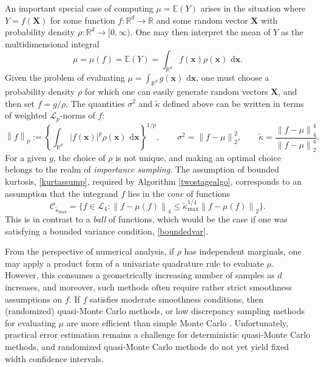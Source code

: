 \documentclass[graybox]{svmult}
\newcommand\reals{\mathbb{R}}
\newcommand\e{\mathbb{E}}
\newcommand{\vx}{\boldsymbol{x}}
\newcommand{\vX}{\boldsymbol{X}}
\newcommand{\rd}{\,\mathrm{d}}
\newcommand{\abs}[1]{\left|#1\right|}
\newcommand{\dif}{\rd}
\newcommand{\tkappa}{\tilde{\kappa}}
\newcommand{\cc}{\mathcal{C}}
\newcommand{\cl}{\mathcal{L}}
\def\abs#1{\ensuremath{\left \lvert #1 \right \rvert}}
\newcommand{\norm}[2][{}]{\ensuremath{\left \lVert #2 \right \rVert}_{#1}}
\begin{document}
An important special case of computing $\mu=\e(Y)$ arises in the situation where $Y=f(\vX)$ for some function $f: \reals^d \to \reals$ and some random vector $\vX$ with probability density $\rho: \reals^d \to [0,\infty)$.  One may then interpret the mean of $Y$ as the multidimensional integral 
\begin{equation} \label{muintegral}
\mu=\mu(f)=\e(Y) = \int_{\reals^d} f(\vx) \rho(\vx) \, \dif \vx.
\end{equation}
Given the problem of evaluating $\mu=\int_{\reals^d} g(\vx) \, \dif \vx$, one must choose a probability density $\rho$ for which one can easily generate random vectors $\vX$, and then set $f = g/\rho$.  The quantities $\sigma^2$ and $\tkappa$ defined above can be written in terms of weighted $\cl_p$-norms of $f$:
\begin{equation} \label{Lpnormdef}
\norm[p]{f} :=\left\{\int_{\reals^d} \abs{f(\vx)}^p \rho(\vx) \, \dif \vx\right\}^{1/p}, \qquad
\sigma^2 = \norm[2]{f-\mu}^2, \qquad \tkappa = \frac{\norm[4]{f-\mu}^4}{\norm[2]{f-\mu}^4}.
\end{equation}
For a given $g$, the choice of $\rho$ is not unique, and making an optimal choice belongs to the realm of \emph{importance sampling}. The assumption of bounded kurtosis, \eqref{kurtassump}, required by Algorithm \ref{twostagealgo}, corresponds to an assumption that the integrand $f$ lies in the \emph{cone} of functions
\begin{equation} \label{conedef}
\cc_{\tkappa_{\max}} = \{ f \in \cl_4 : \norm[4]{f-\mu(f)} \le \tkappa_{\max}^{1/4} \norm[2]{f-\mu(f)} \}.
\end{equation}
This is in contrast to a \emph{ball} of functions, which would be the case if one was satisfying a bounded variance condition, \eqref{boundedvar}.

From the perspective of numerical analysis, if $\rho$ has independent marginals, one may apply a product form of a univariate quadrature rule to evaluate $\mu$.  However, this consumes a geometrically increasing number of samples as $d$ increases, and moreover, such methods often require rather strict smoothness assumptions on $f$.  If $f$ satisfies moderate smoothness conditions, then (randomized) quasi-Monte Carlo methods, or low discrepancy sampling methods for evaluating $\mu$ are more efficient than simple Monte Carlo \citep{Nie92,SloJoe94,Lem09a,DicPil10a}.  Unfortunately, practical error estimation remains a challenge for deterministic quasi-Monte Carlo methods, and randomized quasi-Monte Carlo methods do not yet yield fixed width confidence intervals.
\end{document}
